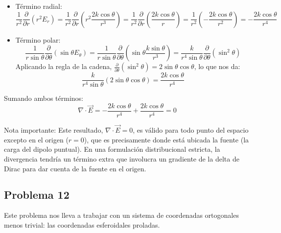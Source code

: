 \documentclass[11pt,spanish]{article}
\newcounter{problema}
\begin{document}
\begin{itemize}
\begin{itemize}
\item Término radial:
    $$\frac{1}{r^2} \frac{\partial}{\partial r}(r^2 E_r) = \frac{1}{r^2} \frac{\partial}{\partial r} \left( r^2 \frac{2k\cos\theta}{r^3} \right) = \frac{1}{r^2} \frac{\partial}{\partial r} \left( \frac{2k\cos\theta}{r} \right) = \frac{1}{r^2} \left( - \frac{2k\cos\theta}{r^2} \right) = - \frac{2k\cos\theta}{r^4}$$
\item Término polar:
    $$\frac{1}{r\sin\theta} \frac{\partial}{\partial \theta}(\sin\theta E_\theta) = \frac{1}{r\sin\theta} \frac{\partial}{\partial \theta} \left( \sin\theta \frac{k\sin\theta}{r^3} \right) = \frac{k}{r^4\sin\theta} \frac{\partial}{\partial \theta}(\sin^2\theta)$$
    Aplicando la regla de la cadena, $\frac{\partial}{\partial \theta}(\sin^2\theta) = 2\sin\theta\cos\theta$, lo que nos da:
    $$\frac{k}{r^4\sin\theta} (2\sin\theta\cos\theta) = \frac{2k\cos\theta}{r^4}$$
\end{itemize}

Sumando ambos términos:
$$
\nabla \cdot \vec{E} = - \frac{2k\cos\theta}{r^4} + \frac{2k\cos\theta}{r^4} = 0
$$

Nota importante: Este resultado, $\nabla \cdot \vec{E} = 0$, es válido para todo punto del espacio excepto en el origen ($r=0$), que es precisamente donde está ubicada la fuente (la carga del dipolo puntual). En una formulación distribucional estricta, la divergencia tendría un término extra que involucra un gradiente de la delta de Dirac para dar cuenta de la fuente en el origen.
\end{itemize}

\subsection*{Problema 12}

Este problema nos lleva a trabajar con un sistema de coordenadas ortogonales menos trivial: las coordenadas esferoidales proladas.
\end{document}

